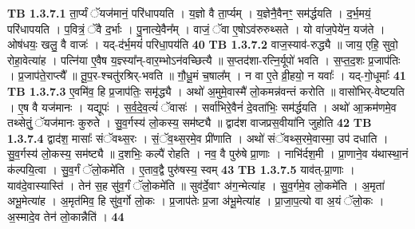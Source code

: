 \documentclass[17pt]{extarticle}
\begin{document}
                                \textbf{ TB 1.3.7.1} \newline
                  ता॒र्प्यं ॅयज॑मानं॒ परि॑धापयति । य॒ज्ञो वै ता॒र्प्यम् । य॒ज्ञेनै॒वैनꣳ॒॒ सम॑र्द्धयति । द॒र्भ॒मयं॒ परि॑धापयति । प॒वित्रं॒ ॅवै द॒र्भाः । पु॒नात्ये॒वैन᳚म् । वाजं॒ ॅवा ए॒षोऽव॑रुरुथ्सते । यो वा॑ज॒पेये॑न॒ यज॑ते । ओष॑धयः॒ खलु॒ वै वाजः॑ । यद्-द॑र्भ॒मयं॑ परिधा॒पय॑ति \textbf{ 40} \newline
                  \newline
                                \textbf{ TB 1.3.7.2} \newline
                  वाज॒स्याव॑-रुद्ध्यै ॥ जाय॒ एहि॒ सुवो॒ रोहा॒वेत्या॑ह । पत्नि॑या ए॒वैष य॒ज्ञ्स्या᳚न्-वार॒म्भोऽन॑वच्छित्यै ॥ स॒प्तद॑शा-रत्नि॒र्यूपो॑ भवति । स॒प्त॒द॒शः प्र॒जाप॑तिः । प्र॒जाप॑ते॒राप्त्यै᳚ ॥ तू॒प॒र-श्चतु॑रश्रिर्-भवति ॥ गौ॒धू॒मं च॒षाल᳚म् । न वा ए॒ते व्री॒हयो॒ न यवाः᳚ । यद्-गो॒धूमाः᳚ \textbf{ 41} \newline
                  \newline
                                \textbf{ TB 1.3.7.3} \newline
                  ए॒वमि॑व॒ हि प्र॒जाप॑तिः॒ समृ॑द्ध्यै । अथो॑ अ॒मुमे॒वास्मै॑ लो॒कमन्न॑वन्तं करोति ॥ वासो॑भिर्-वेष्टयति । ए॒ष वै यज॑मानः । यद्यूपः॑ । स॒र्व॒दे॒व॒त्यं॑ ॅवासः॑ । सर्वा॑भिरे॒वैनं॑ दे॒वता॑भिः॒ सम॑र्द्धयति । अथो॑ आ॒क्रम॑णमे॒व तथ्सेतुं॒ ॅयज॑मानः कुरुते । सु॒व॒र्गस्य॑ लो॒कस्य॒ सम॑ष्ट्यै ॥ द्वाद॑श वाजप्रस॒वीया॑नि जुहोति \textbf{ 42} \newline
                  \newline
                                \textbf{ TB 1.3.7.4} \newline
                  द्वाद॑श॒ मासाः᳚ संॅवथ्स॒रः । सं॒ॅव॒थ्स॒रमे॒व प्री॑णाति । अथो॑ संॅवथ्स॒रमे॒वास्मा॒ उप॑ दधाति । सु॒व॒र्गस्य॑ लो॒कस्य॒ सम॑ष्ट्यै ॥ द॒शभिः॒ कल्पै॑ रोहति । नव॒ वै पुरु॑षे प्रा॒णाः । नाभि॑र्दश॒मी । प्रा॒णाने॒व य॑थास्था॒नं क॑ल्पयि॒त्वा । सु॒व॒र्गं ॅलो॒कमे॑ति । ए॒ताव॒द्वै पुरु॑षस्य॒ स्वम् \textbf{ 43} \newline
                  \newline
                                \textbf{ TB 1.3.7.5} \newline
                  याव॑त्-प्रा॒णाः । याव॑दे॒वास्यास्ति॑ । तेन॑ स॒ह सु॑व॒र्गं ॅलो॒कमे॑ति ॥ सुव॑र्दे॒वाꣳ अ॑ग॒न्मेत्या॑ह । सु॒व॒र्गमे॒व लो॒कमे॑ति । अ॒मृता॑ अभू॒मेत्या॑ह । अ॒मृत॑मिव॒ हि सु॑व॒र्गो लो॒कः । प्र॒जाप॑तेः प्र॒जा अ॑भू॒मेत्या॑ह । प्रा॒जा॒प॒त्यो वा अ॒यं ॅलो॒कः । अ॒स्मादे॒व तेन॑ लो॒कान्नैति॑ । \textbf{ 44} \newline
                  \newline
\end{document}

